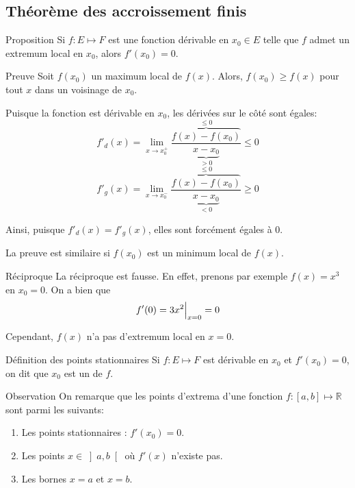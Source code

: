 \documentclass[a4paper]{article}
\begin{document}
\subsection{Théorème des accroissement finis}
\begin{parag}{Proposition}
    Si $f : E \mapsto F$ est une fonction dérivable en $x_0 \in E$ telle que $f$ admet un extremum local en $x_0$, alors $f'\left(x_0\right) = 0$.

    \begin{subparag}{Preuve}
        Soit $f\left(x_0\right)$ un maximum local de $f\left(x\right)$. Alors, $f\left(x_0\right) \geq f\left(x\right)$ pour tout $x$ dans un voisinage de $x_0$.

        Puisque la fonction est dérivable en $x_0$, les dérivées sur le côté sont égales: 
        \[f'_d\left(x\right) = \lim_{x \to x_0^+} \frac{\overbrace{f\left(x\right) - f\left(x_0\right)}^{\leq 0}}{\underbrace{x - x_0}_{> 0}} \leq 0 \]
        \[f'_g\left(x\right) = \lim_{x \to x_0^-} \frac{\overbrace{f\left(x\right) - f\left(x_0\right)}^{\leq 0}}{\underbrace{x - x_0}_{< 0}} \geq 0 \]

        Ainsi, puisque $f'_d\left(x\right) = f'_g\left(x\right)$, elles sont forcément égales à 0.

        La preuve est similaire si $f\left(x_0\right)$ est un minimum local de $f\left(x\right)$.
    \end{subparag}

    \begin{subparag}{Réciproque}
        La réciproque est fausse. En effet, prenons par exemple $f\left(x\right) = x^3$ en $x_0 = 0$. On a bien que  
        \[f'\left(0\right) = 3x^2 \eval_{x=0}^{} = 0\]
        
        Cependant, $f\left(x\right)$ n'a pas d'extremum local en $x = 0$.
    \end{subparag}
\end{parag}

\begin{parag}{Définition des points stationnaires}
    Si $f : E \mapsto F$ est dérivable en $x_0$ et $f'\left(x_0\right) = 0$, on dit que $x_0$ est un  de $f$.
\end{parag}

\begin{parag}{Observation}
    On remarque que les points d'extrema d'une fonction $f : \left[a, b\right] \mapsto \mathbb{R}$ sont parmi les suivants:
    \begin{enumerate}
        \item Les points stationnaires : $f'\left(x_0\right) = 0$.
        \item Les points $x \in \left]a, b\right[$ où $f'\left(x\right)$ n'existe pas.
        \item Les bornes $x = a$ et $x = b$.
    \end{enumerate}
\end{parag}
\end{document}
